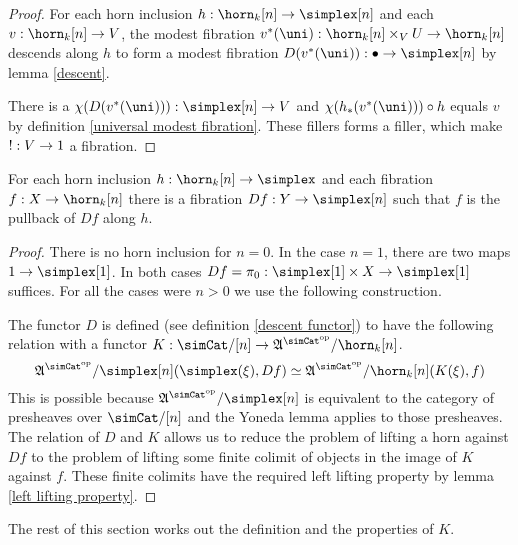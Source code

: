 \documentclass[csh.tex]{subfiles}
\begin{document}
\begin{proof} For each horn inclusion $h\of \horn_k[n]\to\simplex[n]$ and each $v\of \horn_k[n]\to V$, the modest fibration $v\ri(\uni)\of \horn_k[n]\times_V U \to \horn_k[n]$ descends along $h$ to form a modest fibration $D(v\ri(\uni))\of \bullet\to\simplex[n]$ by lemma \ref{descent}.


There is a $\chi(D(v\ri(\uni)))\of\simplex[n]\to V$ and $\chi(h_*(v\ri(\uni)))\circ h$ equals $v$ by definition \ref{universal modest fibration}. These fillers forms a filler, which make $!: V\to 1$ a fibration. %
\end{proof}

\begin{lemma}
For each horn inclusion $h\of \horn_k[n]\to\simplex$ and each fibration $f\of X\to \horn_k[n]$ there is a fibration $Df\of Y\to\simplex[n]$ such that $f$ is the pullback of $Df$ along $h$.
\label{descent}
\end{lemma}

\begin{proof} There is no horn inclusion for $n=0$. In the case $n=1$, there are two maps $1\to\simplex[1]$. In both cases $Df=\pi_0\of \simplex[1]\times X \to\simplex[1]$ suffices. For all the cases were $n>0$ we use the following construction.

The functor $D$ is defined (see definition \ref{descent functor}) to have the following relation with a functor $K\of\simCat/[n]\to\ambient\s/\horn_k[n]$.
\[ \ambient\s/\simplex[n](\simplex(\xi), Df)\simeq \ambient\s/\horn_k[n](K(\xi), f) \]
This is possible because $\ambient\s/\simplex[n]$ is equivalent to the category of presheaves over $\simCat/[n]$ and the Yoneda lemma applies to those presheaves. %
The relation of $D$ and $K$ allows us to reduce the problem of lifting a horn against $Df$ to the problem of lifting some finite colimit of objects in the image of $K$ against $f$. These finite colimits have the required left lifting property by lemma \ref{left lifting property}.
\end{proof}

The rest of this section works out the definition and the properties of $K$.
\end{document}
